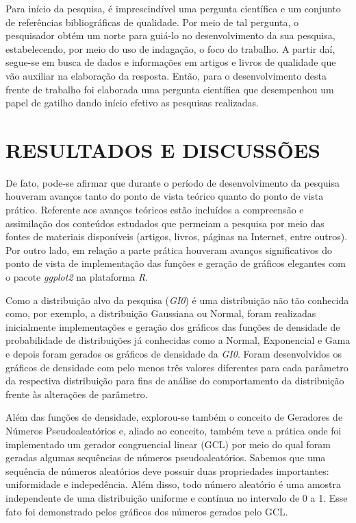 \documentclass[12pt,letterpaper]{article}
\begin{document}
	Para início da pesquisa, é imprescindível uma pergunta científica e um conjunto de referências bibliográficas de qualidade. Por meio de tal pergunta, o pesquisador obtém um norte para guiá-lo no desenvolvimento da sua pesquisa, estabelecendo, por meio do uso de indagação, o foco do trabalho. A partir daí, segue-se em busca de dados e informações em artigos e livros de qualidade que vão auxiliar na elaboração da resposta. Então, para o desenvolvimento desta frente de trabalho foi elaborada uma pergunta científica que desempenhou um papel de gatilho dando início efetivo as pesquisas realizadas.



\newpage
\section*{\centering \textbf{RESULTADOS E DISCUSSÕES}} %

De fato, pode-se afirmar que durante o período de desenvolvimento da pesquisa houveram avanços tanto do ponto de vista teórico quanto do ponto de vista prático. Referente aos avanços teóricos estão incluídos a compreensão e assimilação dos conteúdos estudados que permeiam a pesquisa por meio das fontes de materiais disponíveis (artigos, livros, páginas na Internet, entre outros). Por outro lado, em relação a parte prática houveram avanços significativos do ponto de vista de implementação das funções e geração de gráficos elegantes com o pacote \textit{ggplot2} na plataforma \textit{R}.

Como a distribuição alvo da pesquisa (\textit{GI0}) é uma distribuição não tão conhecida como, por exemplo, a distribuição Gaussiana ou Normal, foram realizadas inicialmente implementações e geração dos gráficos das funções de densidade de probabilidade de distribuições já conhecidas como a Normal, Exponencial e Gama e depois foram gerados os gráficos de densidade da \textit{GI0}. Foram desenvolvidos os gráficos de densidade com pelo menos três valores diferentes para cada parâmetro da respectiva distribuição para fins de análise do comportamento da distribuição frente às alterações de parâmetro.

	Além das funções de densidade, explorou-se também o conceito de Geradores de Números Pseudoaleatórios e, aliado ao conceito, também teve a prática onde foi implementado um gerador congruencial linear (GCL) por meio do qual foram geradas algumas sequências de números pseudoaleatórios. Sabemos que uma sequência de números aleatórios deve possuir duas propriedades importantes: uniformidade e indepedência. Além disso, todo número aleatório é uma amostra independente de uma distribuição uniforme e contínua no intervalo de 0 a 1. Esse fato foi demonstrado pelos gráficos dos números gerados pelo GCL.
    
\end{document}

